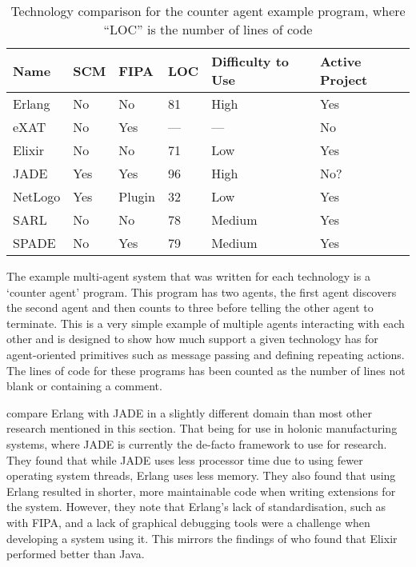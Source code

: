 \begin{table}[h]
    \centering
    \begin{tabular}{llllll}
        \toprule
        Name & SCM & FIPA & LOC & Difficulty to Use & Active Project\\
        \midrule
        Erlang & No & No & 81 & High & Yes\\[0.5ex]
        eXAT & No & Yes & --- & --- & No\\[0.5ex]
        Elixir & No & No & 71 & Low & Yes\\[0.5ex]
        JADE & Yes & Yes & 96 & High & No?\\[0.5ex]
        NetLogo & Yes & Plugin & 32 & Low & Yes\\[0.5ex]
        SARL & No & No & 78 & Medium & Yes\\[0.5ex]
        SPADE & No & Yes & 79 & Medium & Yes\\
        \bottomrule
    \end{tabular}
    \caption{Technology comparison for the counter agent example program, where ``LOC'' is the number of lines of code}\label{tab:tech_comparison}
\end{table}

The example multi-agent system that was written for each technology is a `counter agent' program.
This program has two agents, the first agent discovers the second agent and then counts to three before telling the other agent to terminate.
This is a very simple example of multiple agents interacting with each other and is designed to show how much support a given technology has for agent-oriented primitives such as message passing and defining repeating actions.
The lines of code for these programs has been counted as the number of lines not blank or containing a comment.

 compare Erlang with JADE in a slightly different domain than most other research mentioned in this section.
That being for use in holonic manufacturing systems, where JADE is currently the de-facto framework to use for research.
They found that while JADE uses less processor time due to using fewer operating system threads, Erlang uses less memory.
They also found that using Erlang resulted in shorter, more maintainable code when writing extensions for the system.
However, they note that Erlang's lack of standardisation, such as with FIPA, and a lack of graphical debugging tools were a challenge when developing a system using it.
This mirrors the findings of  who found that Elixir performed better than Java.

